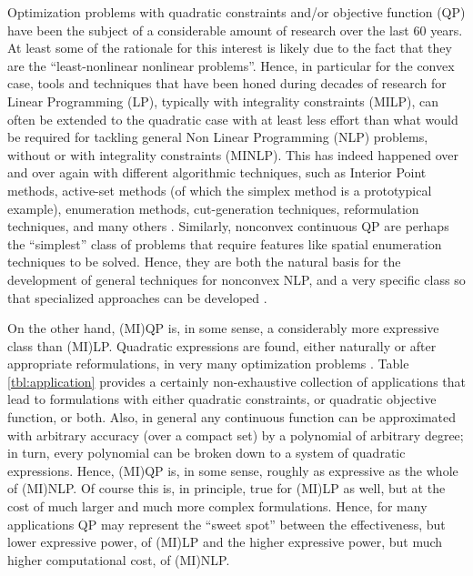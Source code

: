 Optimization problems with quadratic constraints and/or objective function (QP) have been the subject of a considerable amount of research over the last 60 years. At least some of the rationale for this interest is likely due to the fact that they are the ``least-nonlinear nonlinear problems''. Hence, in particular for the convex case, tools and techniques that have been honed during decades of research for Linear Programming (LP), typically with integrality constraints (MILP), can often be extended to the quadratic case with at least less effort than what would be required for tackling general Non Linear Programming (NLP) problems, without or with integrality constraints (MINLP). This has indeed happened over and over again with different algorithmic techniques, such as Interior Point methods, active-set methods (of which the simplex method is a prototypical example), enumeration methods, cut-generation techniques, reformulation techniques, and many others \cite{BS09}.
Similarly, nonconvex continuous QP are perhaps the ``simplest'' class of problems that require features like spatial enumeration techniques to be solved.
Hence, they are both the natural basis for the development of general techniques for nonconvex NLP, and a very specific class so that specialized approaches can be developed \cite{Dur2010,Burer2012}.

On the other hand, (MI)QP is, in some sense, a considerably more expressive class than (MI)LP. Quadratic expressions are found, either naturally or after appropriate reformulations, in very many optimization problems \cite{Kochenberger2014}. Table \ref{tbl:application} provides a certainly non-exhaustive collection of applications that lead to formulations with either quadratic constraints, or quadratic objective function, or both. Also, in general any continuous function can be approximated with arbitrary accuracy (over a compact set) by a polynomial of arbitrary degree; in turn, every polynomial can be broken down to a system of quadratic expressions. Hence, (MI)QP is, in some sense, roughly as expressive as the whole of (MI)NLP. Of course this is, in principle, true for (MI)LP as well, but at the cost of much larger and much more complex formulations. Hence, for many applications QP may represent the ``sweet spot'' between the effectiveness, but lower expressive power, of (MI)LP and the higher expressive power, but much higher computational cost, of (MI)NLP.


